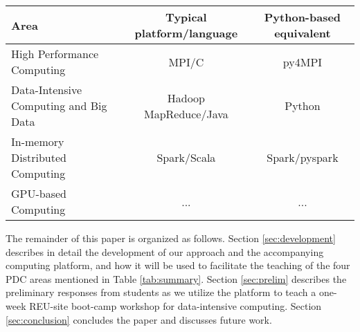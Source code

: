 \begin{table*}
\caption{PDC Areas, their traditional platform/language for educational purpose, and the new corresponding Python-platform/libraries}
\label{tab:summary}
\centering
\begin{tabular}{|l|c|c|}
\hline
Area & Typical platform/language & Python-based equivalent \\
\hline
High Performance Computing & MPI/C & py4MPI \\
\hline
Data-Intensive Computing and Big Data  & Hadoop MapReduce/Java & Python \\
\hline
In-memory Distributed Computing & Spark/Scala & Spark/pyspark \\
\hline
GPU-based Computing & ... & ... \\
\hline
\end{tabular}
\end{table*}

The remainder of this paper is organized as follows. Section \ref{sec:development} describes in detail the development of our approach and the accompanying computing platform, and how it will be used to facilitate the teaching of the four PDC areas mentioned in Table \ref{tab:summary}. Section \ref{sec:prelim} describes the preliminary responses from students as we utilize the platform to teach a one-week REU-site boot-camp workshop for data-intensive computing. Section \ref{sec:conclusion} concludes the paper and discusses future work.
